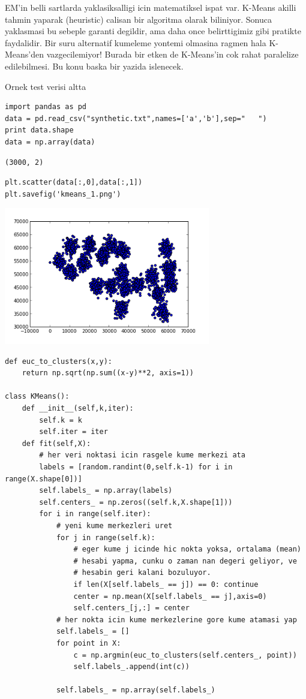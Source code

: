 \documentclass[12pt,fleqn]{article}\usepackage{../common}
\begin{document}
EM'in belli sartlarda yaklasiksalligi icin matematiksel ispat
var. K-Means akilli tahmin yaparak (heuristic) calisan bir algoritma
olarak biliniyor. Sonuca yaklasmasi bu sebeple garanti degildir, ama
daha once belirttigimiz gibi pratikte faydalidir. Bir suru alternatif
kumeleme yontemi olmasina ragmen hala K-Means'den vazgecilemiyor!
Burada bir etken de K-Means'in cok rahat paralelize edilebilmesi. Bu
konu baska bir yazida islenecek.

Ornek test verisi altta

\begin{verbatim}
import pandas as pd
data = pd.read_csv("synthetic.txt",names=['a','b'],sep="   ")
print data.shape
data = np.array(data)
\end{verbatim}

\begin{verbatim}
(3000, 2)
\end{verbatim}

\begin{verbatim}
plt.scatter(data[:,0],data[:,1])
plt.savefig('kmeans_1.png')
\end{verbatim}

\includegraphics[height=6cm]{kmeans_1.png}
\begin{verbatim}
def euc_to_clusters(x,y):
    return np.sqrt(np.sum((x-y)**2, axis=1))

class KMeans():
    def __init__(self,k,iter):
        self.k = k
        self.iter = iter
    def fit(self,X):
        # her veri noktasi icin rasgele kume merkezi ata
        labels = [random.randint(0,self.k-1) for i in range(X.shape[0])]
        self.labels_ = np.array(labels)
        self.centers_ = np.zeros((self.k,X.shape[1]))
        for i in range(self.iter):
            # yeni kume merkezleri uret
            for j in range(self.k):
                # eger kume j icinde hic nokta yoksa, ortalama (mean)
                # hesabi yapma, cunku o zaman nan degeri geliyor, ve
                # hesabin geri kalani bozuluyor.
                if len(X[self.labels_ == j]) == 0: continue
                center = np.mean(X[self.labels_ == j],axis=0)
                self.centers_[j,:] = center
            # her nokta icin kume merkezlerine gore kume atamasi yap
            self.labels_ = []
            for point in X:
                c = np.argmin(euc_to_clusters(self.centers_, point))
                self.labels_.append(int(c))

            self.labels_ = np.array(self.labels_)
\end{verbatim}
\end{document}
